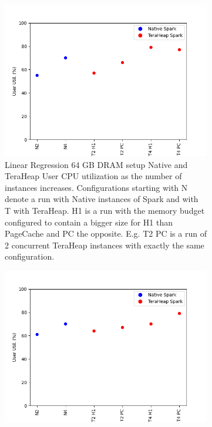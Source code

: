 \begin{figure}[htbp]
	\centering
        \begin{subfigure}[b]{0.48\textwidth}
        \includegraphics[width=\linewidth]{./fig/LINR_64_USR.png}
    \caption{Linear Regression 64 GB DRAM setup Native and TeraHeap
    User CPU utilization as the number of instances increases. Configurations
    starting with N denote a run with Native instances of Spark and
    with T with TeraHeap. H1 is a run with the memory budget
    configured to contain a bigger size for H1 than PageCache and PC
    the opposite. E.g. T2 PC is a run of 2 concurrent TeraHeap
    instances with exactly the same configuration.}
		\label{fig:linr_64_usr}
        \end{subfigure}
   \begin{subfigure}[b]{0.48\textwidth}
    \includegraphics[width=\linewidth]{./fig/LOGR_64_USR.png}

\end{subfigure}
\end{figure}

